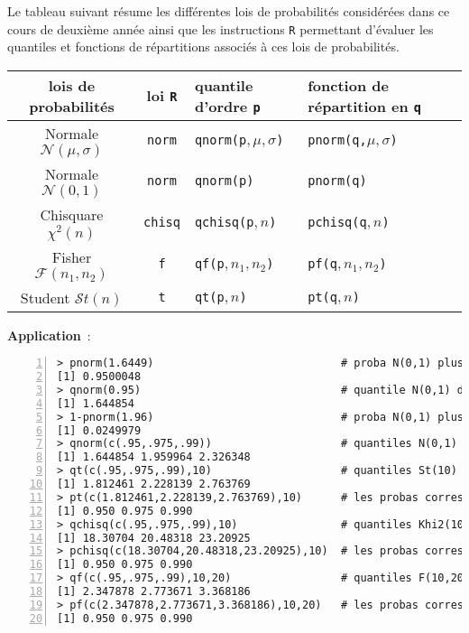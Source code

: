 \documentclass[10pt]{article}
\begin{document}
Le tableau suivant r{\'e}sume les diff{\'e}rentes lois de probabilit{\'e}s consid{\'e}r{\'e}es dans ce cours de deuxi{\`e}me ann{\'e}e ainsi que les instructions \verb+R+ permettant d'{\'e}valuer les quantiles et fonctions de r{\'e}partitions associ{\'e}s {\`a} ces lois de probabilit{\'e}s.

\begin{center}
\begin{tabular}{ccll}
\hline
\quad lois de probabilit{\'e}s \quad &\quad loi \verb+R+ \quad &quantile d'ordre \verb+p+ \qquad&  fonction de r{\'e}partition en \verb+q+\qquad \\
\hline \hline
Normale $\mathcal{N}(\mu,\sigma)$ & \verb+norm+ & \verb+qnorm(p+$,\mu,\sigma$\verb+)+ & \verb+pnorm(q,+$\mu,\sigma$\verb+)+ \\
Normale $\mathcal{N}(0,1)$ & \verb+norm+ & \verb+qnorm(p)+ & \verb+pnorm(q)+ \\
Chisquare $\chi^2(n)$ & \verb+chisq+ & \verb+qchisq(p+$,n$\verb+)+ & \verb+pchisq(q+$,n$\verb+)+ \\
Fisher $\mathcal{F}(n_1,n_2)$ & \verb+f+ & \verb+qf(p+$,n_1,n_2$\verb+)+ & \verb+pf(q+$,n_1,n_2$\verb+)+ \\
Student $\mathcal{S}t(n)$ & \verb+t+ & \verb+qt(p+$,n$\verb+)+ & \verb+pt(q+$,n$\verb+)+ \\
\hline
\end{tabular}
\end{center}

\noindent\textbf{Application}~:
\begin{Verbatim}[frame=leftline,fontfamily=tt,fontshape=n,numbers=left]
> pnorm(1.6449)                             # proba N(0,1) plus petit que 1.6449
[1] 0.9500048
> qnorm(0.95)                               # quantile N(0,1) d'ordre 95% proche de 1.6449
[1] 1.644854
> 1-pnorm(1.96)                             # proba N(0,1) plus grand que 1.96 proche de 2.5% 
[1] 0.0249979
> qnorm(c(.95,.975,.99))                    # quantiles N(0,1) d'ordre 95%, 97.5% et 99% 
[1] 1.644854 1.959964 2.326348
> qt(c(.95,.975,.99),10)                    # quantiles St(10) d'ordre 95%, 97.5% et 99%
[1] 1.812461 2.228139 2.763769
> pt(c(1.812461,2.228139,2.763769),10)      # les probas correspondantes
[1] 0.950 0.975 0.990
> qchisq(c(.95,.975,.99),10)                # quantiles Khi2(10) d'ordre 95%, 97.5% et 99%
[1] 18.30704 20.48318 23.20925
> pchisq(c(18.30704,20.48318,23.20925),10)  # les probas correspondantes
[1] 0.950 0.975 0.990
> qf(c(.95,.975,.99),10,20)                 # quantiles F(10,20) d'ordre 95%, 97.5% et 99%
[1] 2.347878 2.773671 3.368186
> pf(c(2.347878,2.773671,3.368186),10,20)   # les probas correspondantes
[1] 0.950 0.975 0.990
\end{Verbatim}
\end{document}
